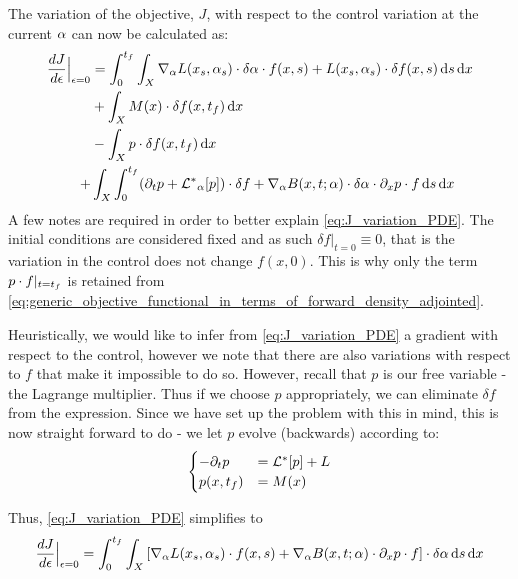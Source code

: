 The variation of the objective, $J$, with respect to the control
variation at the current $\alpha$ can now be calculated as:
\begin{align}
\frac {dJ}{d{\epsilon}} \Big|_{{\epsilon} = 0} &= 
\int_0^{ t_f }\int_X { \nabla }_\alpha L(x_s, \alpha_s) \cdot \delta \alpha \cdot f(x,s) +
L(x_s, \alpha_s) \cdot \delta f(x,s)
\, \mathrm{d} s\, \mathrm{d} x 
\notag \\
&+ 
\int_X  M(x)\cdot \delta f(x,{ t_f }) \, \mathrm{d} x \notag
\\ &- 
\int_X    p\cdot \delta f(x, { t_f })     \, \mathrm{d} x  \notag \\+& 
    \int_X \int_0^{ t_f }  ({\partial}_t p  + { { \mathcal{L} }^* }_{\alpha} [p]) \cdot \delta f 
    + { \nabla }_\alpha B(x,t;\alpha) \cdot \delta \alpha \cdot  {\partial}_xp \cdot f 
     \, \mathrm{d} s
    \, \mathrm{d} x
\label{eq:J_variation_PDE}
\end{align}
A few notes are required in order to better explain \cref{eq:J_variation_PDE}.
The initial conditions are considered fixed and as such $\delta f |_{t=0} \equiv
0 $, that is the variation in the control does not change $f(x, 0)$. This is
why only the term $p\cdot f|_{t={ t_f }}$ is retained from \cref{eq:generic_objective_functional_in_terms_of_forward_density_adjointed}.

Heuristically, we would like to infer from \cref{eq:J_variation_PDE} a gradient
with respect to the control, however we note that there are also variations with
respect to $f$ that make it impossible to do so. However, recall that $p$ is
our free variable - the Lagrange multiplier. Thus if we choose $p$
appropriately, we can eliminate $\delta f$ from the expression. Since we
have set up the problem with this in mind, this is now straight forward
to do - we let $p$ evolve (backwards) according to:
\begin{equation}
\begin{cases}
-{\partial}_t p &= { { \mathcal{L} }^* }[p] + L
\\
p(x, { t_f }) &=  M(x)  
\end{cases}
\label{eq:generic_adjoint_PDE}
\end{equation}

Thus, \cref{eq:J_variation_PDE} simplifies to
\begin{equation}
\frac {dJ}{d{\epsilon}} \Big|_{{\epsilon} = 0} =
\int_0^{ t_f }\int_X \left[ { \nabla }_\alpha L(x_s, \alpha_s) \cdot f(x,s) +
 { \nabla }_\alpha B(x,t;\alpha) \cdot {\partial}_xp \cdot f \right] \cdot \delta \alpha
     \, \mathrm{d} s    \, \mathrm{d} x
\label{eq:J_variation_PDE_simplified}
\end{equation}

